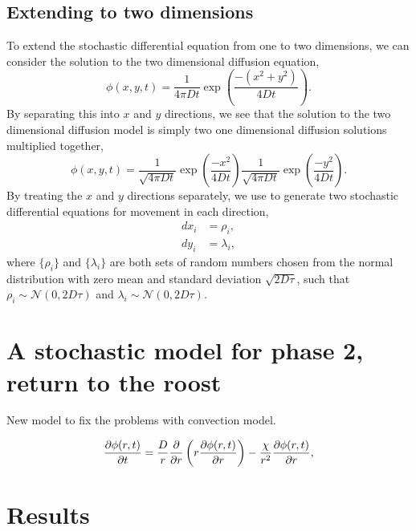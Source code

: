 \subsection{Extending to two dimensions}

To extend the stochastic differential equation from one to two dimensions, we can consider the solution to the two dimensional diffusion equation,
%
\begin{equation}
\phi(x,y,t) = \frac{1}{4\pi Dt}\exp \left(\frac{-(x^2+y^2)}{4Dt} \right) .
\label{eqn:diffusion_solution2d}
\end{equation}
%
By separating this into $x$ and $y$ directions, we see that the solution to the two dimensional diffusion model is simply two one dimensional diffusion solutions multiplied together,
\begin{equation}
\phi(x,y,t) = \frac{1}{\sqrt{4\pi Dt}}\exp \left(\frac{-x^2}{4Dt} \right) \frac{1}{\sqrt{4\pi Dt}}\exp \left(\frac{-y^2}{4Dt} \right) .
\end{equation}
%
By treating the $x$ and $y$ directions separately, we use  to generate two stochastic differential equations for movement in each direction,
\begin{align}
%
dx_i &= \rho_i, \\
dy_i &= \lambda_i,
\end{align}
%
where $\{\rho_i\}$ and $\{\lambda_i\}$ are both sets of random numbers chosen from the normal distribution with zero mean and standard deviation $\sqrt{2D\tau}$, such that $\rho_i \sim \mathcal{N}(0,2D\tau)$ and $\lambda_i \sim \mathcal{N}(0,2D\tau)$.


\section{A stochastic model for phase 2, return to the roost}
New model to fix the problems with convection model.

\begin{equation}
  \frac{\partial \phi(r,t)}{\partial t} = \frac{D}{r} \frac{\partial }{\partial r}\left(r \frac{\partial \phi(r,t)}{\partial r} \right) - \frac{\chi}{r^2} \frac{\partial \phi(r,t)}{\partial r},
  \label{eqn:convection}
\end{equation}

\section{Results}

